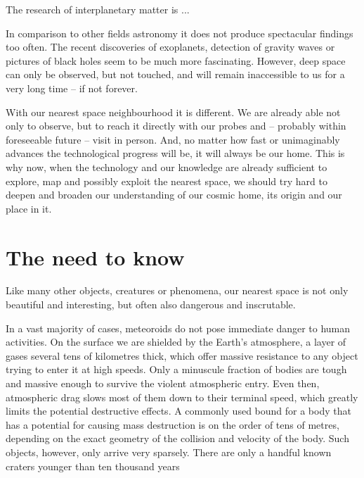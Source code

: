 
The research of interplanetary matter is ... 

In comparison to other fields astronomy it does not produce spectacular findings too often.
The recent discoveries of exoplanets, detection of gravity waves or pictures of black holes seem to be much more fascinating.
However, deep space can only be observed, but not touched, and will remain inaccessible to us for a very long time -- if not forever.

With our nearest space neighbourhood it is different. We are already able not only to observe, but to reach it directly with our probes
and -- probably within foreseeable future -- visit in person.
And, no matter how fast or unimaginably advances the technological progress will be, it will always be our home.
This is why now, when the technology and our knowledge are already sufficient to explore, map and possibly exploit
the nearest space, we should try hard to deepen and broaden our understanding of our cosmic home, its origin and our place in it.

\section{The need to know} \label{in}

    Like many other objects, creatures or phenomena, our nearest space is not only beautiful and interesting, but often
    also dangerous and inscrutable.




    In a vast majority of cases, meteoroids do not pose immediate danger to human activities.
    On the surface we are shielded by the Earth's atmosphere, a layer of gases several tens of kilometres
    thick, which offer massive resistance to any object trying to enter it at high speeds.
    Only a minuscule fraction of bodies are tough and massive enough to survive the violent atmospheric entry.
    Even then, atmospheric drag slows most of them down to their terminal speed, which greatly limits the potential destructive effects.
    A commonly used bound for a body that has a potential for causing mass destruction is on the order of tens of metres,
    depending on the exact geometry of the collision and velocity of the body. Such objects, however, only arrive very sparsely.
    There are only a handful known craters younger than ten thousand years \citep{???}

